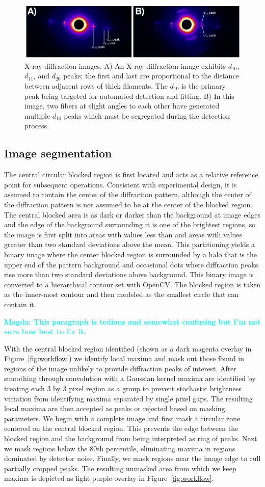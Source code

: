 \documentclass{sig-alternate}
\newcommand{\note}[2]{
    \textbf{\textcolor{#1}{#2}}
}
\newcommand{\magda}[1]{\note{Cyan}{Magda: #1}}
\newcommand{\figureimgs}{
\begin{figure}[tbp]
  \centering
  \includegraphics[width=\linewidth]{figures/x_ray_image_montage}
  \vspace{-12pt}
  \caption{\label{fig:imgs}
  	X-ray diffraction images.
    A) An X-ray diffraction image exhibits $d_{10}$, $d_{11}$, and
    $d_{20}$ peaks; the first and last are proportional to the
    distance between adjacent rows of thick filaments. The $d_{10}$ is
    the primary peak being targeted for automated detection and
    fitting. B) In this image, two fibers at slight angles to each
    other have generated multiple $d_{10}$ peaks which must be
    segregated during the detection process.  
	}
	\vspace{-2pt}
\end{figure}
}
\begin{document}
\figureimgs



\subsection{Image segmentation}

The central circular blocked region is first located and acts as a
relative reference point for subsequent operations. Consistent with
experimental design, it is assumed to contain the center of the
diffraction pattern, although the center of the diffraction pattern is
not assumed to be at the center of the blocked region. The central
blocked area is as dark or darker than the background at image edges
and the edge of the background surrounding it is one of the brightest
regions, so the image is first split into areas with values less than
and areas with values greater than two standard deviations above the
mean. This partitioning yields a binary image where the center blocked
region is surrounded by a halo that is the upper end of the pattern
background and occasional dots where diffraction peaks rise more than
two standard deviations above background. This binary image is
converted to a hierarchical contour set with OpenCV. The blocked
region is taken as the inner-most contour and then modeled as the
smallest circle that can contain it. 


\magda{This paragraph is tedious and somewhat confusing but I'm
not sure how best to fix it.}
With the central blocked region identified (shown as a dark magenta
overlay in Figure~\ref{fig:workflow}) we identify local maxima and
mask out those found in regions of the image unlikely to provide
diffraction peaks of interest.  After smoothing through convolution
with a Gaussian kernel maxima are identified by treating each 3 by 3
pixel region as a group to prevent stochastic brightness variation
from identifying maxima separated by single pixel gaps. The resulting
local maxima are then accepted as peaks or rejected based on masking
parameters.  We begin with a complete image and first mask a circular
zone centered on the central blocked region. This prevents the edge
between the blocked region and the background from being interpreted
as ring of peaks. Next we mask regions below the 80th percentile,
eliminating maxima in regions dominated by detector noise. Finally, we
mask regions near the image edge to cull partially cropped peaks. The
resulting unmasked area from which we keep maxima is depicted as light
purple overlay in Figure~\ref{fig:workflow}.
\end{document}
